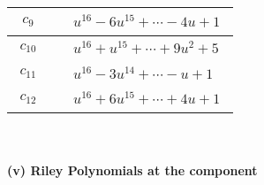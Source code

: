 \documentclass[1p]{elsarticle_modified}
\theoremstyle{definition}
\begin{document}
\begin{tabular}{m{50pt}|m{274pt}}
\hline $$\begin{aligned}c_{9}\end{aligned}$$&$\begin{aligned}
&u^{16}-6 u^{15}+\cdots-4 u+1
\end{aligned}$\\
\hline $$\begin{aligned}c_{10}\end{aligned}$$&$\begin{aligned}
&u^{16}+u^{15}+\cdots+9 u^2+5
\end{aligned}$\\
\hline $$\begin{aligned}c_{11}\end{aligned}$$&$\begin{aligned}
&u^{16}-3 u^{14}+\cdots- u+1
\end{aligned}$\\
\hline $$\begin{aligned}c_{12}\end{aligned}$$&$\begin{aligned}
&u^{16}+6 u^{15}+\cdots+4 u+1
\end{aligned}$\\
\hline
\end{tabular}\\~\\
\newpage\renewcommand{\arraystretch}{1}
\flushleft \textbf{(v) Riley Polynomials at the component}\newline \\
\end{document}
